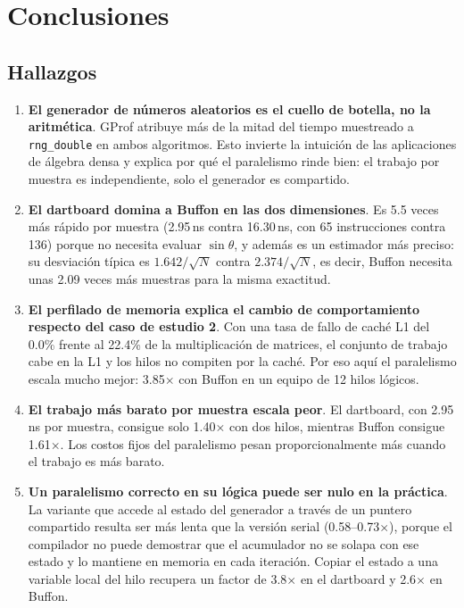 \section{Conclusiones}

\subsection{Hallazgos}

\begin{enumerate}
    \item \textbf{El generador de números aleatorios es el cuello de botella, no la aritmética}. GProf atribuye más de la mitad del tiempo muestreado a \texttt{rng\_double} en ambos algoritmos. Esto invierte la intuición de las aplicaciones de álgebra densa y explica por qué el paralelismo rinde bien: el trabajo por muestra es independiente, solo el generador es compartido.

    \item \textbf{El dartboard domina a Buffon en las dos dimensiones}. Es 5.5 veces más rápido por muestra (2.95\,ns contra 16.30\,ns, con 65 instrucciones contra 136) porque no necesita evaluar $\sin\theta$, y además es un estimador más preciso: su desviación típica es $1.642/\sqrt{N}$ contra $2.374/\sqrt{N}$, es decir, Buffon necesita unas 2.09 veces más muestras para la misma exactitud.

    \item \textbf{El perfilado de memoria explica el cambio de comportamiento respecto del caso de estudio 2}. Con una tasa de fallo de caché L1 del 0.0\% frente al 22.4\% de la multiplicación de matrices, el conjunto de trabajo cabe en la L1 y los hilos no compiten por la caché. Por eso aquí el paralelismo escala mucho mejor: 3.85$\times$ con Buffon en un equipo de 12 hilos lógicos.

    \item \textbf{El trabajo más barato por muestra escala peor}. El dartboard, con 2.95\,ns por muestra, consigue solo 1.40$\times$ con dos hilos, mientras Buffon consigue 1.61$\times$. Los costos fijos del paralelismo pesan proporcionalmente más cuando el trabajo es más barato.

    \item \textbf{Un paralelismo correcto en su lógica puede ser nulo en la práctica}. La variante que accede al estado del generador a través de un puntero compartido resulta ser más lenta que la versión serial (0.58--0.73$\times$), porque el compilador no puede demostrar que el acumulador no se solapa con ese estado y lo mantiene en memoria en cada iteración. Copiar el estado a una variable local del hilo recupera un factor de 3.8$\times$ en el dartboard y 2.6$\times$ en Buffon.


\end{enumerate}
